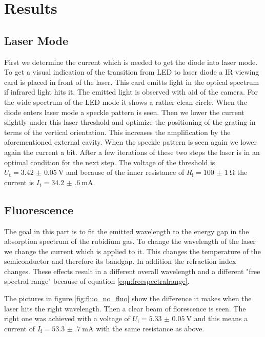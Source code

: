 \section{Results}
\label{sec:Auswertung}

\subsection{Laser Mode}

First we determine the current which is needed to get the diode into laser mode.
To get a visual indication of the transition from LED to laser diode a IR viewing card is placed in front of the laser. This card emitts light in the optical spectrum if infrared light hits it.
The emitted light is observed with aid of the camera.
For the wide spectrum of the LED mode it shows a rather clean circle. When the diode enters laser mode a speckle pattern is seen. Then we lower the current slightly under this laser threshold and optimize the positioning of the grating in terms of the vertical orientation. This increases the amplification by the aforementioned external cavity. When the speckle pattern is seen again we lower again the current a bit. After a few iterations of these two steps the laser is in an optimal condition for the next step. The voltage of the threshold is $U_\text{t} = \SI{3.42(5)}{\volt}$ and because of the inner resistance of $R_\text{i} = \SI{100(1)}{\ohm}$ the current is $I_\text{t} = \SI{34.2(6)}{\milli\ampere}$.

\subsection{Fluorescence}

The goal in this part is to fit the emitted wavelength to the energy gap in the absorption spectrum of the rubidium gas.
To change the wavelength of the laser we change the current which is applied to it. This changes the temperature of the semiconductor and therefore its bandgap. In addition the refraction index changes. These effects result in a different overall wavelength and a different "free spectral range" because of equation \eqref{eqn:freespectralrange}.

The pictures in figure \ref{fig:fluo_no_fluo} show the difference it makes when the laser hits the right wavelength. Then a clear beam of florescence is seen. The right one was achieved with a voltage of $U_\text{f} = \SI{5.33(5)}{\volt}$ and this means a current of $I_\text{f} = \SI{53.3(7)}{\milli\ampere}$ with the same resistance as above.

